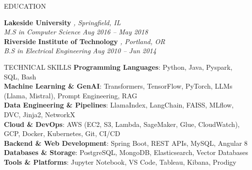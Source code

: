 \documentclass{resume} %
\begin{document}
\vspace{0.0 em}

\begin{rSection}{EDUCATION}

{\bf Lakeside University} \textit{, Springfield, IL} \\
\textit{M.S in Computer Science} \hfill \textit{Aug 2016 – May 2018} \\
\vspace{-0.3em}
{\bf Riverside Institute of Technology} \textit{, Portland, OR} \\
\textit{B.S in Electrical Engineering} \hfill \textit{Aug 2010 – Jun 2014}

\end{rSection}

\vspace{-0.2em}
\begin{rSection}{TECHNICAL SKILLS}
\textbf{Programming Languages}: Python, Java, Pyspark, SQL, Bash \\
\textbf{Machine Learning \& GenAI}: Transformers, TensorFlow, PyTorch, LLMs (Llama, Mistral), Prompt Engineering, RAG \\
\textbf{Data Engineering \& Pipelines}:  LlamaIndex, LangChain, FAISS, MLflow, DVC, Jinja2, NetworkX \\
\textbf{Cloud \& DevOps}: AWS (EC2, S3, Lambda, SageMaker, Glue, CloudWatch), GCP, Docker, Kubernetes, Git, CI/CD \\
\textbf{Backend \& Web Development}: Spring Boot, REST APIs, MySQL, Angular 8 \\
\textbf{Databases \& Storage}: PostgreSQL, MongoDB, Elasticsearch, Vector Databases \\
\textbf{Tools \& Platforms}: Jupyter Notebook, VS Code, Tableau, Kibana, Prodigy
\end{rSection}
\end{document}
